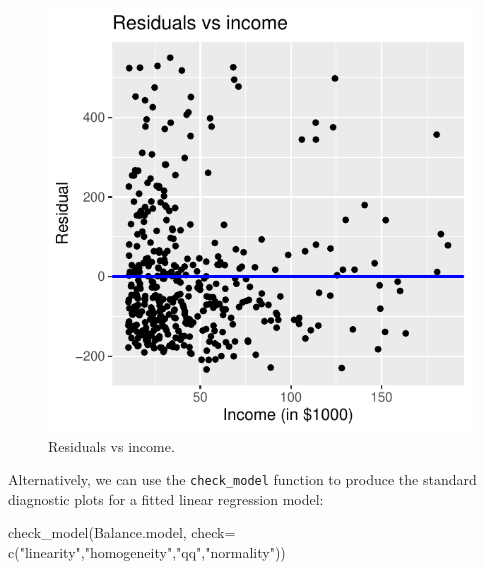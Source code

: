 \documentclass[
  letterpaper,
  DIV=11,
  numbers=noendperiod]{scrartcl}
\newenvironment{Shaded}{\begin{snugshade}}{\end{snugshade}}
\newcommand{\AttributeTok}[1]{\textcolor[rgb]{0.40,0.45,0.13}{#1}}
\newcommand{\FunctionTok}[1]{\textcolor[rgb]{0.28,0.35,0.67}{#1}}
\newcommand{\NormalTok}[1]{\textcolor[rgb]{0.00,0.23,0.31}{#1}}
\newcommand{\StringTok}[1]{\textcolor[rgb]{0.13,0.47,0.30}{#1}}
\begin{document}
\begin{figure}[H]

{\centering \includegraphics{index_files/figure-pdf/unnamed-chunk-32-1.pdf}

}

\caption{Residuals vs income.}

\end{figure}%

Alternatively, we can use the \texttt{check\_model} function to produce
the standard diagnostic plots for a fitted linear regression model:

\begin{Shaded}
\begin{Highlighting}[]
\FunctionTok{check\_model}\NormalTok{(Balance.model, }\AttributeTok{check=} \FunctionTok{c}\NormalTok{(}\StringTok{"linearity"}\NormalTok{,}\StringTok{"homogeneity"}\NormalTok{,}\StringTok{"qq"}\NormalTok{,}\StringTok{"normality"}\NormalTok{))}
\end{Highlighting}
\end{Shaded}
\end{document}
